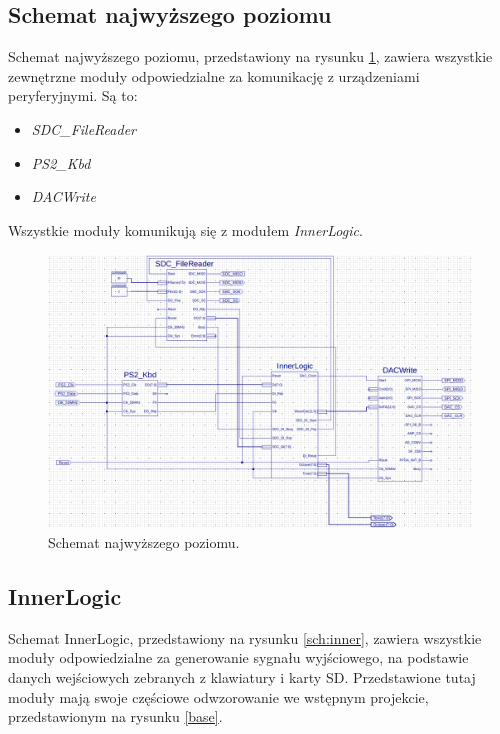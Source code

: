 \documentclass[12pt]{article}
\begin{document}
\subsection{Schemat najwyższego poziomu}
Schemat najwyższego poziomu, przedstawiony na rysunku \ref{sch:main}, zawiera wszystkie zewnętrzne moduły odpowiedzialne za komunikację z urządzeniami peryferyjnymi. Są to:
\begin{itemize}[noitemsep]
  \item \textit{SDC\_FileReader}
  \item \textit{PS2\_Kbd}
  \item \textit{DACWrite}
\end{itemize}
Wszystkie moduły komunikują się z modułem \textit{InnerLogic}.


\begin{figure}[h]
  \centering
  \includegraphics[width=\linewidth]{images/main}
  \caption{Schemat najwyższego poziomu.}
  \label{sch:main}
\end{figure}

\subsection{InnerLogic}

Schemat InnerLogic, przedstawiony na rysunku \ref{sch:inner}, zawiera wszystkie moduły odpowiedzialne za generowanie sygnału wyjściowego, na podstawie danych wejściowych zebranych z klawiatury i karty SD. Przedstawione tutaj moduły mają swoje częściowe odwzorowanie we wstępnym projekcie, przedstawionym na rysunku \ref{base}.
\end{document}
